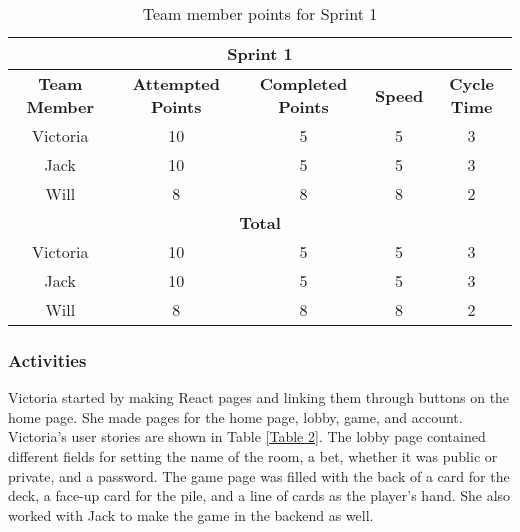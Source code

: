 \begin{table}[h]
\begin{tabular}{|ccccc|}
\hline
\multicolumn{5}{|c|}{\textbf{Sprint 1}}                                                                                                                                                                  \\ \hline
\multicolumn{1}{|c|}{\textbf{Team Member}} & \multicolumn{1}{c|}{\textbf{Attempted Points}} & \multicolumn{1}{c|}{\textbf{Completed Points}} & \multicolumn{1}{c|}{\textbf{Speed}} & \textbf{Cycle Time} \\ \hline
\multicolumn{1}{|c|}{Victoria}             & \multicolumn{1}{c|}{10}                        & \multicolumn{1}{c|}{5}                         & \multicolumn{1}{c|}{5}              & 3                   \\ \hline
\multicolumn{1}{|c|}{Jack}                 & \multicolumn{1}{c|}{10}                        & \multicolumn{1}{c|}{5}                         & \multicolumn{1}{c|}{5}              & 3                   \\ \hline
\multicolumn{1}{|c|}{Will}                 & \multicolumn{1}{c|}{8}                         & \multicolumn{1}{c|}{8}                         & \multicolumn{1}{c|}{8}              & 2                   \\ \hline
\multicolumn{5}{|c|}{\textbf{Total}}                                                                                                                                                                     \\ \hline
\multicolumn{1}{|c|}{Victoria}             & \multicolumn{1}{c|}{10}                        & \multicolumn{1}{c|}{5}                         & \multicolumn{1}{c|}{5}              & 3                   \\ \hline
\multicolumn{1}{|c|}{Jack}                 & \multicolumn{1}{c|}{10}                        & \multicolumn{1}{c|}{5}                         & \multicolumn{1}{c|}{5}              & 3                   \\ \hline
\multicolumn{1}{|c|}{Will}                 & \multicolumn{1}{c|}{8}                         & \multicolumn{1}{c|}{8}                         & \multicolumn{1}{c|}{8}              & 2                   \\ \hline
\end{tabular}
\caption{Team member points for Sprint 1}
\label{Table 3}
\end{table}


\subsubsection{Activities}
Victoria started by making React pages and linking them through buttons on the home page. She made pages for the home page, lobby, game, and account. Victoria's user stories are shown in Table \ref{Table 2}. The lobby page contained different fields for setting the name of the room, a bet, whether it was public or private, and a password. The game page was filled with the back of a card for the deck, a face-up card for the pile, and a line of cards as the player's hand. She also worked with Jack to make the game in the backend as well. 


